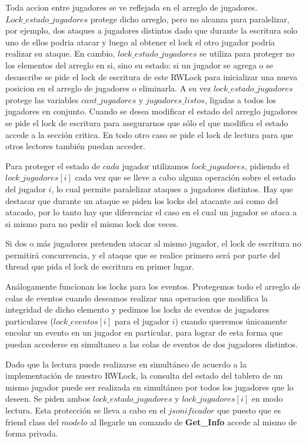 Toda accion entre jugadores se ve reflejada en el arreglo de jugadores. $Lock\_estado\_jugadores$ protege dicho arreglo, pero no alcanza para paralelizar, por ejemplo, dos ataques a jugadores distintos dado que durante la escritura solo uno de ellos podria atacar y luego al obtener el lock el otro jugador podría realizar su ataque. En cambio, $lock\_estado\_jugadores$ se utiliza para proteger no los elementos del arreglo en si, sino su estado: si un jugador se agrega o se desuscribe se pide el lock de escritura de este RWLock para inicializar una nueva posicion en el arreglo de jugadores o eliminarla. A su vez $lock\_estado\_jugadores$ protege las variables $cant\_jugadores$ y $jugadores\_listos$, ligadas a todos los jugadores en conjunto. Cuando se desea modificar el estado del arreglo jugadores se pide el lock de escritura para asegurarnos que sólo el que modifica el estado accede a la sección critica. En todo otro caso se pide el lock de lectura para que otros lectores también puedan acceder.

Para proteger el estado de $cada$ jugador utilizamos $lock\_jugadores$, pidiendo el $lock\_jugadores[i]$ cada vez que se lleve a cabo alguna operación sobre el estado del jugador $i$, lo cual permite paralelizar ataques a jugadores distintos. Hay que destacar que durante un ataque se piden los locks del atacante asi como del atacado, por lo tanto hay que diferenciar el caso en el cual un jugador se ataca a si mismo para no pedir el mismo lock dos veces. 

Si dos o más jugadores pretenden atacar al mismo jugador, el lock de escritura no permitirá concurrencia, y el ataque que se realice primero será por parte del thread que pida el lock de escritura en primer lugar.

Análogamente funcionan los locks para los eventos. Protegemos todo el arreglo de colas de eventos cuando deseamos realizar una operacion que modifica la integridad de dicho elemento y pedimos los locks de eventos de jugadores particulares ($lock\_eventos[i]$ para el jugador $i$) cuando queremos únicamente encolar un evento en un jugador en particular, para lograr de esta forma que puedan accederse en simultaneo a las colas de eventos de dos jugadores distintos.


Dado que la lectura puede realizarse en simultáneo de acuerdo a la implementación de nuestro RWLock, la consulta del estado del tablero de un mismo jugador puede ser realizada en simultáneo por todos los jugadores que lo deseen. Se piden ambos $lock\_estado\_jugadores$ y $lock\_jugadores[i]$ en modo lectura. Esta protección se lleva a cabo en el $jsonificador$ que puesto que es friend class del $modelo$ al llegarle un comando de \textbf{Get\_Info} accede al mismo de forma privada.


